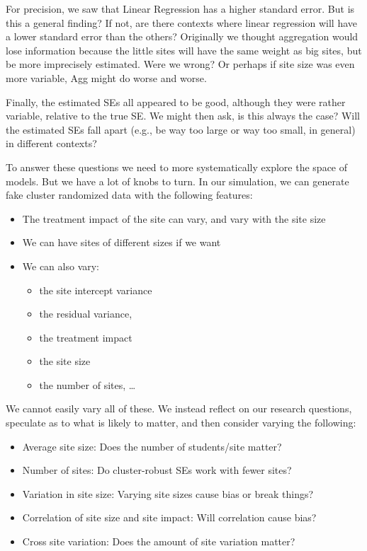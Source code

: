 \documentclass[
]{book}
\providecommand{\tightlist}{%
  \setlength{\itemsep}{0pt}\setlength{\parskip}{0pt}}
\begin{document}
For precision, we saw that Linear Regression has a higher standard error.
But is this a general finding? If not, are there contexts where linear regression will have a lower standard error than the others?
Originally we thought aggregation would lose information because the little sites will have the same weight as big sites, but be more imprecisely estimated.
Were we wrong? Or perhaps if site size was even more variable, Agg might do worse and worse.

Finally, the estimated SEs all appeared to be good, although they were rather variable, relative to the true SE.
We might then ask, is this always the case? Will the estimated SEs fall apart (e.g., be way too large or way too small, in general) in different contexts?

To answer these questions we need to more systematically explore the space of models. But we have a lot of knobs to turn.
In our simulation, we can generate fake cluster randomized data with the following features:

\begin{itemize}
\item
  The treatment impact of the site can vary, and vary with the site size
\item
  We can have sites of different sizes if we want
\item
  We can also vary:

  \begin{itemize}
  \tightlist
  \item
    the site intercept variance
  \item
    the residual variance,
  \item
    the treatment impact
  \item
    the site size
  \item
    the number of sites, \ldots{}
  \end{itemize}
\end{itemize}

We cannot easily vary all of these.
We instead reflect on our research questions, speculate as to what is likely to matter, and then consider varying the following:

\begin{itemize}
\tightlist
\item
  Average site size: Does the number of students/site matter?
\item
  Number of sites: Do cluster-robust SEs work with fewer sites?
\item
  Variation in site size: Varying site sizes cause bias or break things?
\item
  Correlation of site size and site impact: Will correlation cause bias?
\item
  Cross site variation: Does the amount of site variation matter?
\end{itemize}
\end{document}
